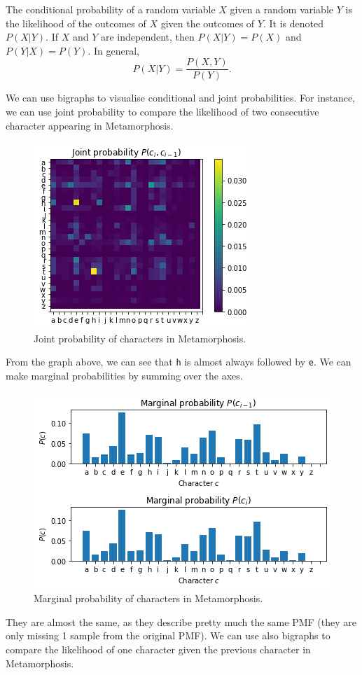 \documentclass[a4paper, openany]{memoir}
\begin{document}
The conditional probability of a random variable $X$ given a random variable $Y$ is the likelihood of the outcomes of $X$ given the outcomes of $Y$. It is denoted $P(X|Y)$. If $X$ and $Y$ are independent, then $P(X|Y) = P(X)$ and $P(Y|X) = P(Y)$. In general,
\[P(X|Y) = \frac{P(X, Y)}{P(Y)}.\]

We can use bigraphs to visualise conditional and joint probabilities. For instance, we can use joint probability to compare the likelihood of two consecutive character appearing in Metamorphosis.
\begin{figure}[H]
    \centering
    \includegraphics[scale=0.6]{src/5.7 joint probability.png}
    \caption{Joint probability of characters in Metamorphosis.}
\end{figure}
\noindent From the graph above, we can see that \texttt{h} is almost always followed by \texttt{e}. We can make marginal probabilities by summing over the axes.
\begin{figure}[H]
    \centering
    \includegraphics[scale=0.6]{src/5.8 marginal probability.png}
    \caption{Marginal probability of characters in Metamorphosis.}
\end{figure}
\noindent They are almost the same, as they describe pretty much the same PMF (they are only missing 1 sample from the original PMF). We can use also bigraphs to compare the likelihood of one character given the previous character in Metamorphosis.
\end{document}

